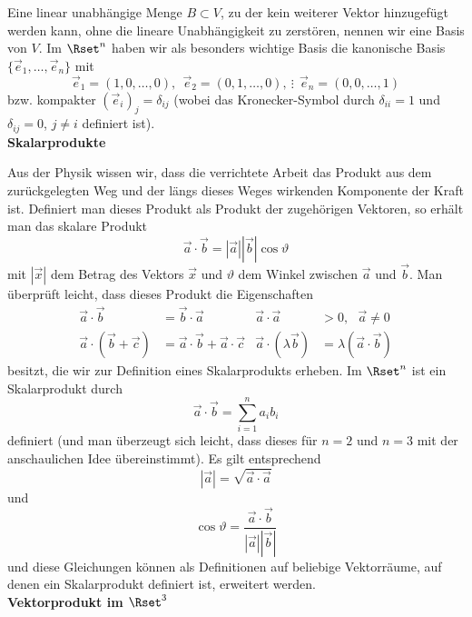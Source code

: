 \documentclass[a4paper,10pt]{article}
\begin{document}
Eine linear unabhängige Menge $B\subset V$, zu der kein weiterer Vektor
hinzugefügt werden kann, ohne die lineare Unabhängigkeit zu zerstören,
nennen wir eine Basis von $V$.
Im $\Rset^n$ haben wir als besonders wichtige Basis die kanonische
Basis $\{\vec{e}_1,\ldots,\vec{e}_n\}$ mit
\[
\vec{e}_1=(1,0,\ldots,0),~~
\vec{e}_2=(0,1,\ldots,0),~
\vdots~~\vec{e}_n=(0,0,\ldots,1)
\]
bzw. kompakter $(\vec{e}_i)_j=\delta_{ij}$
(wobei das Kronecker-Symbol durch $\delta_{ii}=1$ und $\delta_{ij}=0$,
$j\not=i$ definiert ist).\\

{\bf Skalarprodukte}

Aus der Physik wissen wir, dass die verrichtete Arbeit das Produkt aus
dem zurückgelegten Weg und der längs dieses Weges wirkenden Komponente
der Kraft ist.
Definiert man dieses Produkt als Produkt der zugehörigen Vektoren, so
erhält man das skalare Produkt
\[
\vec{a}\cdot \vec{b}=|\vec{a}||\vec{b}|\cos\vartheta
\]
mit $|\vec{x}|$ dem Betrag des Vektors $\vec{x}$
und $\vartheta$ dem Winkel zwischen $\vec{a}$ und $\vec{b}$.
Man überprüft leicht, dass dieses Produkt die Eigenschaften
\begin{align*}
\vec{a}\cdot \vec{b} &= \vec{b}\cdot \vec{a} &
\vec{a}\cdot \vec{a} &> 0,~~~\vec{a}\not=0 \\
\vec{a}\cdot (\vec{b}+\vec{c}) &= \vec{a}\cdot \vec{b} + \vec{a}\cdot \vec{c} &
\vec{a}\cdot (\lambda \vec{b}) &= \lambda (\vec{a}\cdot \vec{b})
\end{align*}
besitzt, die wir zur Definition eines Skalarprodukts erheben.
Im $\Rset^n$ ist ein Skalarprodukt durch
\[
\vec{a}\cdot \vec{b} = \sum_{i=1}^n a_i b_i
\]
definiert (und man überzeugt sich leicht, dass dieses für $n=2$ und $n=3$
mit der anschaulichen Idee übereinstimmt).
Es gilt entsprechend
\[
|\vec{a}|=\sqrt{\vec{a}\cdot \vec{a}}
\]
und
\[
\cos\vartheta = \frac{\vec{a}\cdot \vec{b}}{|\vec{a}||\vec{b}|}
\]
und diese Gleichungen können als Definitionen auf beliebige Vektorräume,
auf denen ein Skalarprodukt definiert ist, erweitert werden.\\

{\bf Vektorprodukt im $\Rset^3$}
\end{document}
